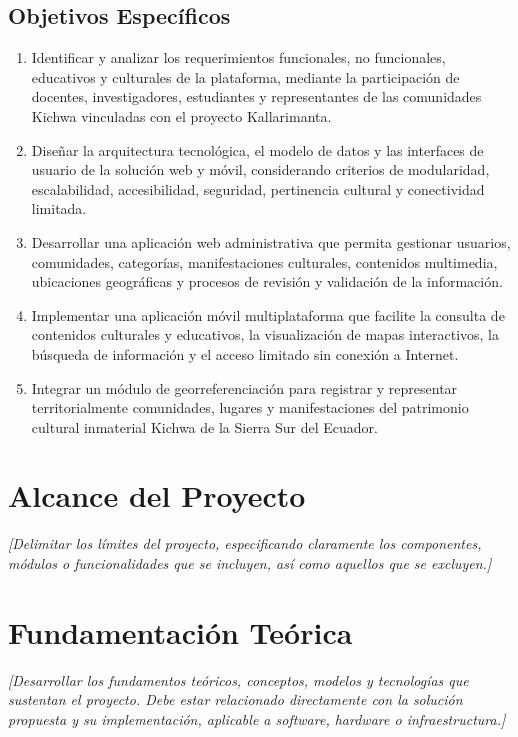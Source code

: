 \subsection{Objetivos Específicos}
\begin{enumerate}
  \item Identificar y analizar los requerimientos funcionales, no funcionales, educativos y culturales de la plataforma, mediante la participación de docentes, investigadores, estudiantes y representantes de las comunidades Kichwa vinculadas con el proyecto Kallarimanta.
  \item Diseñar la arquitectura tecnológica, el modelo de datos y las interfaces de usuario de la solución web y móvil, considerando criterios de modularidad, escalabilidad, accesibilidad, seguridad, pertinencia cultural y conectividad limitada.
  \item Desarrollar una aplicación web administrativa que permita gestionar usuarios, comunidades, categorías, manifestaciones culturales, contenidos multimedia, ubicaciones geográficas y procesos de revisión y validación de la información.
  \item Implementar una aplicación móvil multiplataforma que facilite la consulta de contenidos culturales y educativos, la visualización de mapas interactivos, la búsqueda de información y el acceso limitado sin conexión a Internet.
  \item Integrar un módulo de georreferenciación para registrar y representar territorialmente comunidades, lugares y manifestaciones del patrimonio cultural inmaterial Kichwa de la Sierra Sur del Ecuador.
\end{enumerate}

\section{Alcance del Proyecto}
\textit{[Delimitar los límites del proyecto, especificando claramente los componentes, módulos o funcionalidades que se incluyen, así como aquellos que se excluyen.]}

\section{Fundamentación Teórica}
\textit{[Desarrollar los fundamentos teóricos, conceptos, modelos y tecnologías que sustentan el proyecto. Debe estar relacionado directamente con la solución propuesta y su implementación, aplicable a software, hardware o infraestructura.]}

